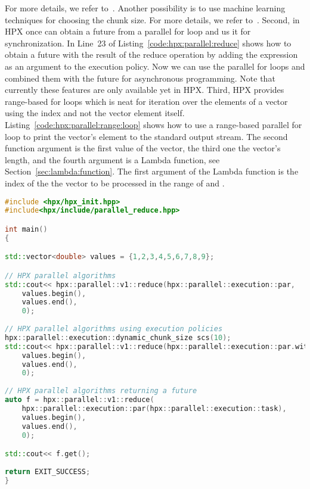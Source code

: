 \vspace{0.25cm}
For more details, we refer to~\cite{grubel2015performance}. Another possibility is to use machine learning techniques for choosing the chunk size. For more details, we refer to~\cite{shirzad2019scheduling}. Second, in HPX once can obtain a future from a parallel for loop and us it for synchronization. In Line~23 of Listing~\ref{code:hpx:parallel:reduce} shows how to obtain a future with the result of the reduce operation by adding the expression  as an argument to the execution policy. Now we can use the parallel for loops and combined them with the future for asynchronous programming. Note that currently these features are only available yet in HPX. Third, HPX provides range-based for loops which is neat for iteration over the elements of a vector using the index and not the vector element itself. Listing~\ref{code:hpx:parallel:range:loop} shows how to use a range-based parallel for loop to print the vector's element to the standard output stream.  The second function argument is the first value of the vector, the third one the vector's length, and the fourth argument is a Lambda function, see Section~\ref{sec:lambda:function}. The first argument of the Lambda function is the index of the the vector to be processed in the range of  and .


\begin{lstlisting}[language=c++,caption={Parallel algorithms (reduce) using HPX.\label{code:hpx:parallel:reduce}},float,floatplacement=tb]
#include <hpx/hpx_init.hpp>
#include<hpx/include/parallel_reduce.hpp>

int main()
{

std::vector<double> values = {1,2,3,4,5,6,7,8,9};

// HPX parallel algorithms
std::cout<< hpx::parallel::v1::reduce(hpx::parallel::execution::par,
	values.begin(),
	values.end(),
	0);
	
// HPX parallel algorithms using execution policies
hpx::parallel::execution::dynamic_chunk_size scs(10);
std::cout<< hpx::parallel::v1::reduce(hpx::parallel::execution::par.with(cs),
	values.begin(),
	values.end(),
	0);
	
// HPX parallel algorithms returning a future
auto f = hpx::parallel::v1::reduce(
	hpx::parallel::execution::par(hpx::parallel::execution::task),
	values.begin(),
	values.end(),
	0);

std::cout<< f.get();
  
return EXIT_SUCCESS;
}

\end{lstlisting}

